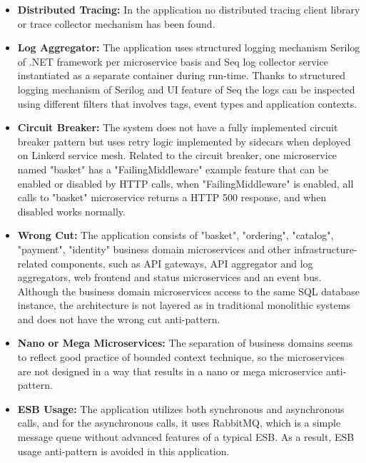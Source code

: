 \documentclass{Configuration_Files/PoliMi3i_thesis}
\begin{document}
\begin{itemize}
    \item \textbf{Distributed Tracing:} In the application no distributed tracing client library or trace collector mechanism has been found.
    
    \item \textbf{Log Aggregator:} The application uses structured logging mechanism Serilog\footnotemark[69] of .NET framework per microservice basis and Seq\footnotemark[70] log collector service instantiated as a separate container during run-time.
    Thanks to structured logging mechanism of Serilog and UI feature of Seq the logs can be inspected using different filters that involves tags, event types and application contexts.
    
    \item \textbf{Circuit Breaker:} The system does not have a fully implemented circuit breaker pattern but uses retry logic implemented by sidecars when deployed on Linkerd service mesh.
    Related to the circuit breaker, one microservice named "basket" has a "FailingMiddleware" example feature that can be enabled or disabled by HTTP calls, when "FailingMiddleware" is enabled, all calls to "basket" microservice returns a HTTP 500 response, and when disabled works normally.
    
    \item \textbf{Wrong Cut:} The application consists of "basket", "ordering", "catalog", "payment", "identity" business domain microservices and other infrastructure-related components, such as API gateways, API aggregator and log aggregators, web frontend and status microservices and an event bus.
    Although the business domain microservices access to the same SQL database instance, the architecture is not layered as in traditional monolithic systems and does not have the wrong cut anti-pattern.
    
    \item \textbf{Nano or Mega Microservices:} The separation of business domains seems to reflect good practice of bounded context technique, so the microservices are not designed in a way that results in a nano or mega microservice anti-pattern.
    
    \item \textbf{ESB Usage:} The application utilizes both synchronous and asynchronous calls, and for the asynchronous calls, it uses RabbitMQ, which is a simple message queue without advanced features of a typical ESB.
    As a result, ESB usage anti-pattern is avoided in this application.
    

\end{itemize}
\end{document}

